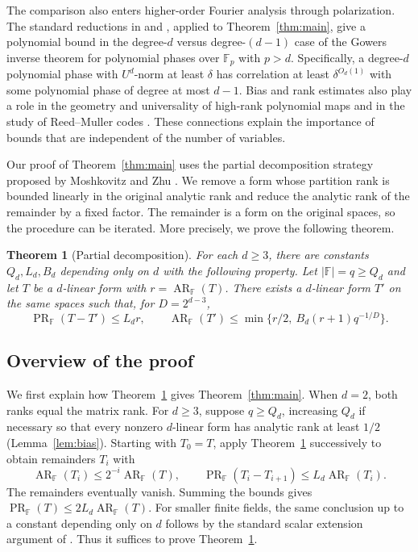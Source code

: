 \documentclass[11pt,reqno]{amsart}
\theoremstyle{plain}
\newtheorem{theorem}{Theorem}[section]
\theoremstyle{definition}
\newcommand{\F}{\mathbb F}
\DeclareMathOperator{\arank}{AR}
\DeclareMathOperator{\prank}{PR}
\begin{document}
The comparison also enters higher-order Fourier analysis through
polarization. The standard reductions in \cite[\S7.3]{CM} and
\cite[\S\S8.2, 8.5]{MZLocal}, applied to Theorem~\ref{thm:main},
give a polynomial bound in the degree-$d$ versus degree-$(d-1)$ case of the Gowers inverse theorem
for polynomial phases over $\mathbb F_p$ with $p>d$. Specifically, a degree-$d$
polynomial phase with $U^d$-norm at least $\delta$ has correlation at least
$\delta^{O_d(1)}$ with some polynomial phase of degree at most $d-1$. Bias and rank estimates also play a role in the
geometry and universality of high-rank polynomial maps
\cite{KZApplications} and in the study of Reed--Muller codes
\cite{BhowmickLovett}. These connections explain the importance of
bounds that are independent of the number of variables.

Our proof of Theorem~\ref{thm:main} uses the partial decomposition strategy proposed by Moshkovitz and Zhu \cite[\S7]{MZSchur}. We remove a form whose partition rank is bounded linearly in the original analytic rank and
reduce the analytic rank of the remainder by a fixed factor. The
remainder is a form on the original spaces, so the procedure can be
iterated. More precisely, we prove the following theorem.

\begin{theorem}[Partial decomposition]\label{thm:partial}
For each $d\geq3$, there are constants $Q_d,L_d,B_d$ depending only on
$d$ with the following property. Let $|\F|=q\geq Q_d$ and let $T$
be a $d$-linear form with $r=\arank_{\F}(T)$. There exists a
$d$-linear form $T'$ on the same spaces such that, for $D=2^{d-3}$,
\begin{equation}\label{eq:partial}
 \prank_{\F}(T-T')\leq L_d r,\qquad
 \arank_{\F}(T')\leq
 \min\{r/2,\ B_d(r+1)q^{-1/D}\}.
\end{equation}
\end{theorem}

\subsection{Overview of the proof}\label{subsec:overview}
We first explain how Theorem~\ref{thm:partial} gives
Theorem~\ref{thm:main}. When $d=2$, both ranks equal the matrix rank. For $d\geq3$, suppose $q\geq Q_d$, increasing $Q_d$ if necessary so
that every nonzero $d$-linear form has analytic rank at least $1/2$
(Lemma~\ref{lem:bias}). Starting with $T_0=T$, apply
Theorem~\ref{thm:partial} successively to obtain remainders $T_i$ with
\[
 \arank_{\F}(T_i)\leq2^{-i}\arank_{\F}(T),\qquad
 \prank_{\F}(T_i-T_{i+1})\leq L_d\arank_{\F}(T_i).
\]
The remainders eventually vanish. Summing the bounds gives $\prank_{\F}(T)\leq2L_d\arank_{\F}(T)$. For smaller finite fields, the same conclusion up to a constant depending only on $d$ follows by the standard scalar extension argument of \cite[Lemmas~8.1 and~8.2]{MZLocal}. Thus it suffices to prove
Theorem~\ref{thm:partial}.
\end{document}
